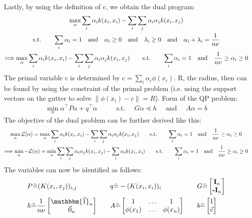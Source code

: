 \documentclass[a4paper]{article}
\newcommand{\norm}[1]{\left\lVert#1\right\rVert}
\newcommand{\1}{\mathds{1}}
\newcommand{\lag}{\mathcal{L}}
\begin{document}
Lastly, by using the definition of c, we obtain the dual program:
\begin{gather*}
	\max_\alpha \sum_i \alpha_i k(x_i,x_i) - \sum_i\sum_j\alpha_i\alpha_j k(x_i,x_j)
	\\
	\text{s.t.} \quad\quad
	\sum_i\alpha_i = 1
	\quad\text{and} \quad
	\alpha_i \geq 0
	\quad\text{and} \quad
	\lambda_i \geq 0
	\quad\text{and} \quad
	\alpha_i + \lambda_i = {1\over n\nu}
	\\
	\Longrightarrow
	\max_\alpha \sum_i \alpha_i k(x_i,x_i) - \sum_i\sum_j\alpha_i\alpha_j k(x_i,x_j)
	\quad\quad\text{s.t.} \quad\quad
	\sum_i\alpha_i = 1
	\quad\text{and} \quad
	{1\over n\nu} \geq \alpha_i \geq 0
\end{gather*}
The primal variable c is determined by $c=\sum_i\alpha_i\phi(x_i)$.
R, the radius, then can be found by using the constraint of the primal problem 
(i.e. using the support vectors on the gutter to solve $\norm{\phi(x_i)-c} = R$).
\newpage
{}
Form of the QP problem:
\begin{align*}
	\min_\alpha \alpha^\top P\alpha + q^\top \alpha \quad\quad & \text{s.t. }\quad G\alpha\preceq h
	 \quad \text{ and }\quad A\alpha=b  
\end{align*}
The objective of the dual problem can be further derived like this:
\begin{gather*}
	\max_\alpha\lag(\alpha )
	=
	\max_\alpha \sum_i \alpha_i k(x_i,x_i) - \sum_i\sum_j\alpha_i\alpha_j k(x_i,x_j)
	\quad\quad\text{s.t.} \quad\quad
	\sum_i\alpha_i = 1
	\quad\text{and} \quad
	{1\over n\nu} \geq \alpha_i \geq 0
	\\
	\Longrightarrow
	\min_\alpha -\lag(\alpha )
	=
	\min_\alpha \sum_i\sum_j\alpha_i\alpha_j k(x_i,x_j) - \sum_i \alpha_i k(x_i,x_i) 
	\quad\quad\text{s.t.} \quad\quad
	\sum_i\alpha_i = 1
	\quad\text{and} \quad
	{1\over n\nu} \geq \alpha_i \geq 0	
\end{gather*}
The variables can now be identified as follows:
\begin{align*}
	& P\hat{=}(K(x_i,x_j))_{i,j} & \quad & 
	q\hat{=}-(K(x_i,x_i))_{i} & \quad & 
	G\hat{=} 
	\begin{bmatrix}
		\textbf{I}_n \\ 
		\textbf{-I}_n 
	\end{bmatrix}
	\\
	&h\hat{=}{1\over n\nu}
	\begin{bmatrix}
		\mathbbm{\vec{1}}_n \\ 
		\vec{0}_n 
	\end{bmatrix}	
	& \quad & A\hat{=}
	\begin{bmatrix}
		1 & \ldots & 1 \\ 
		\phi(x_1) & \ldots & \phi(x_n)  
	\end{bmatrix}
	& \quad & b\hat{=}
	\begin{bmatrix}
		1 \\ 
		\vec{c} 
	\end{bmatrix}
\end{align*} 
\end{document}

